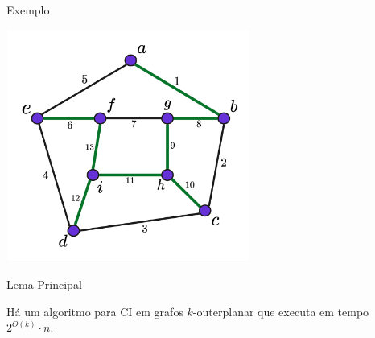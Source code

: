 \begin{frame}{Exemplo}
    \begin{minipage}{\linewidth}
        \centering
        \includegraphics[width=8cm]{images/proof_3.jpg}
    \end{minipage}
\end{frame}

\begin{frame}{Lema Principal}
    \begin{lema}[1]
        \label{lema:1}
        Há um algoritmo para CI em grafos $k$-outerplanar que executa em tempo $2^{O(k)} \cdot n$.
    \end{lema}
\end{frame}
